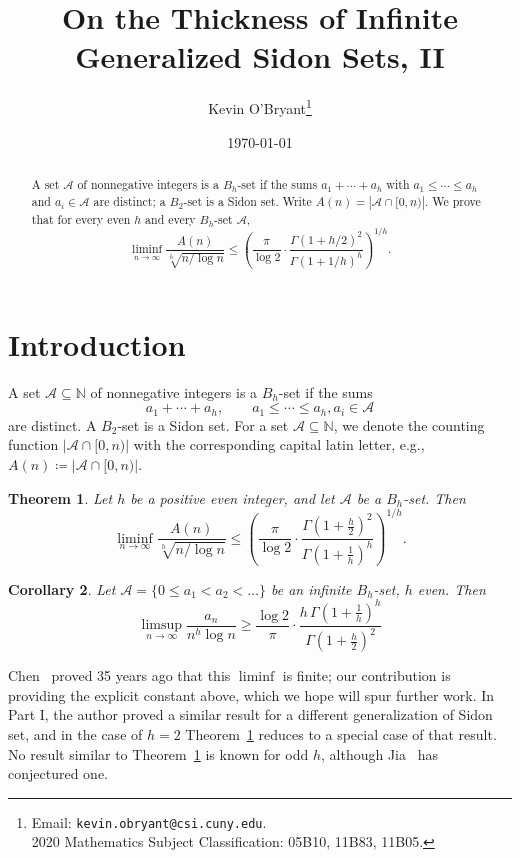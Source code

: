 \documentclass[10pt,letterpaper]{article}
\newcommand{\NN}{\ensuremath{\mathbb N}}
\newcommand{\cA}{\mathcal{A}}
\newtheorem{thm}{Theorem}
\newtheorem{cor}[thm]{Corollary}
\theoremstyle{remark}
\begin{document}
  \title{On the Thickness of Infinite Generalized Sidon Sets, II}
  \author{Kevin O'Bryant\thanks{Email: \texttt{kevin.obryant@csi.cuny.edu}.\\ 2020 Mathematics Subject Classification: 05B10, 11B83, 11B05.}}
  \date{\today}
  \maketitle

\begin{abstract}
A set $\cA$ of nonnegative integers is a $B_h$-set if the sums
$a_1+\cdots+a_h$ with $a_1\le\cdots\le a_h$ and $a_i\in\cA$ are distinct;
a $B_2$-set is a Sidon set. 
Write $A(n)=|\cA\cap[0,n)|$. We prove that for every even $h$ and every $B_h$-set $\cA$,
\[
  \liminf_{n\to\infty} \frac{A(n)}{\sqrt[h]{n/\log n}}
  \le \left(\frac{\pi}{\log 2} 
        \cdot \frac{\Gamma(1+h/2)^2}{\Gamma(1+1/h)^{h}}\right)^{1/h}.
\]
\end{abstract}

\section{Introduction}\label{sec:intro}
A set $\cA \subseteq \NN$ of nonnegative integers is a $B_h$-set if the sums 
  \[a_1+\cdots+a_h, \qquad a_1\le\cdots\le a_h, a_i\in\cA\] 
are distinct. 
A $B_2$-set is a Sidon set.
For a set $\cA\subseteq\NN$, we denote the counting function $|\cA\cap[0,n)|$ with the corresponding capital latin letter, e.g., $A(n)\coloneqq |\cA\cap[0,n)|$.  

\begin{thm}\label{thm:main}
Let $h$ be a positive even integer, and let $\cA$ be a $B_h$-set.
Then
  \[\liminf_{n\to\infty} \frac{A(n)}{\sqrt[h]{n/\log n}} \le 
  \left(\frac{\pi}{\log 2} \cdot \frac{\Gamma(1+\tfrac h2)^2}{\Gamma(1+\tfrac1h)^{h}}\right)^{1/h}.\]
\end{thm}

\begin{cor}%
  Let $\cA=\{0 \le a_1<a_2<\dots\}$ be an infinite $B_h$-set, $h$ even. Then
  \[\limsup_{n\to\infty} \frac{a_n}{n^h \log n} \ge \frac{\log 2}{\pi} \cdot \frac{h \, \Gamma(1+\tfrac1h)^{h}}{\Gamma(1+\tfrac h2)^2}\]
\end{cor}

Chen~\cite{1993.Chen} proved 35 years ago that this $\liminf$ is finite; our contribution is providing the explicit constant above, which we hope will spur further work. In Part I, the author proved a similar result for a different generalization of Sidon set, and in the case of $h=2$ Theorem~\ref{thm:main} reduces to a special case of that result. No result similar to Theorem~\ref{thm:main} is known for odd $h$, although Jia~\cite{1994.Jia} has conjectured one.
\end{document}
